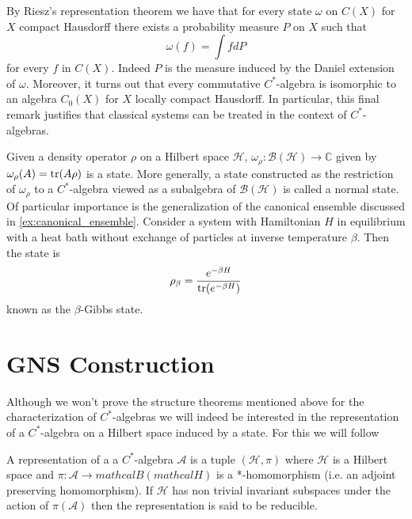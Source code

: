 \begin{example}
By Riesz's representation theorem \cite{Hewitt1975} we have that for every state $\omega$ on $C(X)$ for $X$ compact Hausdorff there exists a probability measure $P$ on $X$ such that
\begin{equation}
\omega (f)=\int fdP
\end{equation}    
for every $f$ in $C(X)$. Indeed $P$ is the measure induced by the Daniel extension of $\omega$. Moreover, it turns out that every commutative $C^*$-algebra is isomorphic to an algebra $C_0(X)$ for $X$ locally compact Hausdorff\cite{Bratteli1997}. In particular, this final remark justifies that classical systems can be treated in the context of $C^*$-algebras. 
\end{example}

\begin{example}\label{ex:Gibbs}
Given a density operator $\rho$ on a Hilbert space $\mathcal{H}$, $\omega_\rho:\mathcal{B} (\mathcal{H})\rightarrow\mathbb{C}$ given by $\omega_\rho(A)=\operatorname{tr}(A\rho)$ is a state. More generally, a state constructed as the restriction of $\omega_\rho$ to a $C^*$-algebra viewed as a subalgebra of $\mathcal{B}(\mathcal{H})$ is called a normal state. Of particular importance is the generalization of the canonical ensemble discussed in \ref{ex:canonical_ensemble}. Consider a system with Hamiltonian $H$ in equilibrium with a heat bath without exchange of particles at inverse temperature $\beta$. Then the state is
\begin{equation}
\rho_\beta=\frac{e^{-\beta H}}{\operatorname{tr}(e^{-\beta H})}
\end{equation}
known as the $\beta$-Gibbs state\cite{Kubo1965}\cite{Duvenhage1999}. 
\end{example}

\section{GNS Construction}

Although we won't prove the structure theorems mentioned above for the characterization of $C^*$-algebras we will indeed be interested in the representation of a $C^*$-algebra on a Hilbert space induced by a state. For this we will follow \cite{Bratteli1997} 

\begin{definition}
A representation of a a $C^*$-algebra $\mathcal{A}$ is a tuple $(\mathcal{H},\pi)$ where $\mathcal{H}$ is a Hilbert space and $\pi:\mathcal{A}\rightarrow mathcal{B}(mathcal{H})$ is a *-homomorphism (i.e. an adjoint preserving homomorphism). If $\mathcal{H}$ has non trivial invariant subspaces under the action of $\pi(\mathcal{A})$ then the representation is said to be reducible.
\end{definition}

